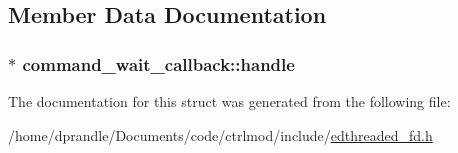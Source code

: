 \subsection{Member Data Documentation}
\hypertarget{structcommand__wait__callback_a0abd24ce601b0e1452cde7eddb7b85b9}{
\subsubsection[{handle}]{$\ast$ command\-\_\-wait\-\_\-callback\-::handle}}\label{structcommand__wait__callback_a0abd24ce601b0e1452cde7eddb7b85b9}


The documentation for this struct was generated from the following file\-:\begin{DoxyCompactItemize}
\item 
/home/dprandle/\-Documents/code/ctrlmod/include/\hyperlink{edthreaded__fd_8h}{edthreaded\-\_\-fd.\-h}\end{DoxyCompactItemize}
